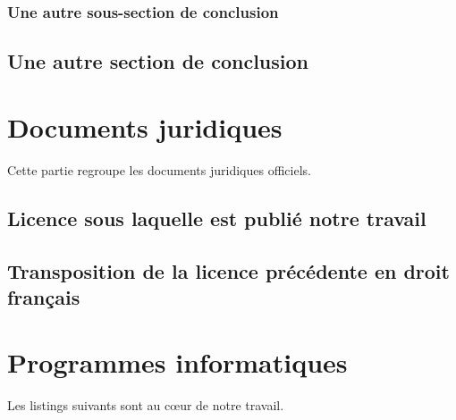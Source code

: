 \documentclass[12pt,version=final,space=onehalf,localtocs,localbibs]{yathesis}
\begin{document}
\subsection{Une autre sous-section de conclusion}
\lipsum[29-31]
\section{Une autre section de conclusion}
\lipsum[28-43]
%
\printbibliography
%
\appendix
%
\chapter{Documents juridiques}
\label{chap-juridique}

Cette partie regroupe les documents juridiques officiels.

\section{Licence sous laquelle est publié notre travail}
\label{sec-discours}

\lipsum[11-30]

\section{Transposition de la licence précédente en droit français}
\label{sec-autre-discours}

\lipsum[31-50]
%
\chapter{Programmes informatiques}
\label{chap-listings}

Les listings suivants sont au cœur de notre travail.
\end{document}
